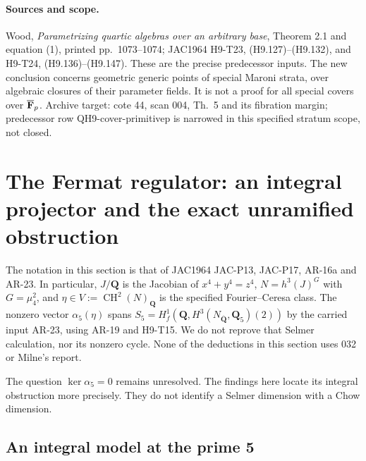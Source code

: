 \documentclass[11pt]{article}
\theoremstyle{remark}\newtheorem{remark}[theorem]{Remark}
\begin{document}
\paragraph{Sources and scope.}
Wood, \emph{Parametrizing quartic algebras over an arbitrary base},
Theorem 2.1 and equation (1), printed pp.~1073--1074; JAC1964 H9-T23,
(H9.127)--(H9.132), and H9-T24, (H9.136)--(H9.147). These are the
precise predecessor inputs. The new conclusion concerns geometric
generic points of special Maroni strata, over algebraic closures of
their parameter fields. It is not a proof for all special covers over
$\overline{\mathbf F}_p$. Archive target: cote 44, scan 004, Th.~5 and its
fibration margin; predecessor row QH9-cover-primitivep is narrowed in
this specified stratum scope, not closed.



\section{The Fermat regulator: an integral projector and the exact
unramified obstruction}

The notation in this section is that of JAC1964 JAC-P13, JAC-P17,
AR-16a and AR-23.  In particular, $J/\mathbf Q$ is the Jacobian of
$x^4+y^4=z^4$, $N=h^3(J)^G$ with $G=\mu_4^2$, and
$\eta\in V:=\operatorname{CH}^2(N)_{\mathbf Q}$ is the specified
Fourier--Ceresa class.  The nonzero vector
$\alpha_5(\eta)$ spans
$S_5=H^1_f(\mathbf Q,H^3(N_{\overline{\mathbf Q}},\mathbf Q_5)(2))$
by the carried input AR-23, using AR-19 and H9-T15.  We do not reprove
that Selmer calculation, nor its nonzero cycle.  None of the deductions
in this section uses 032 or Milne's report.

The question $\ker\alpha_5=0$ remains unresolved.  The findings here
locate its integral obstruction more precisely.  They do not identify
a Selmer dimension with a Chow dimension.

\subsection{An integral model at the prime 5}
\end{document}
